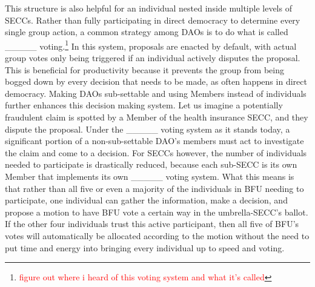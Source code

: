 \documentclass{article}[10pt]
\begin{document}
This structure is also helpful for an individual nested inside multiple levels of SECCs.
Rather than fully participating in direct democracy to determine every single group action, a common strategy among DAOs is to do what is called \_\_\_\_\_ voting.\footnote{
    \textcolor{red}{figure out where i heard of this voting system and what it's called}}
In this system, proposals are enacted by default, with actual group votes only being triggered if an individual actively disputes the proposal.
This is beneficial for productivity because it prevents the group from being bogged down by every decision that needs to be made, as often happens in direct democracy.
Making DAOs sub-settable and using Members instead of individuals further enhances this decision making system.
Let us imagine a potentially fraudulent claim is spotted by a Member of the health insurance SECC, and they dispute the proposal.
Under the \_\_\_\_\_ voting system as it stands today, a significant portion of a non-sub-settable DAO's members must act to investigate the claim and come to a decision.
For SECCs however, the number of individuals needed to participate is drastically reduced, because each sub-SECC is its own Member that implements its own \_\_\_\_\_ voting system.
What this means is that rather than all five or even a majority of the individuals in BFU needing to participate, one individual can gather the information, make a decision, and propose a motion to have BFU vote a certain way in the umbrella-SECC's ballot.
If the other four individuals trust this active participant, then all five of BFU's votes will automatically be allocated according to the motion without the need to put time and energy into bringing every individual up to speed and voting.
\end{document}
